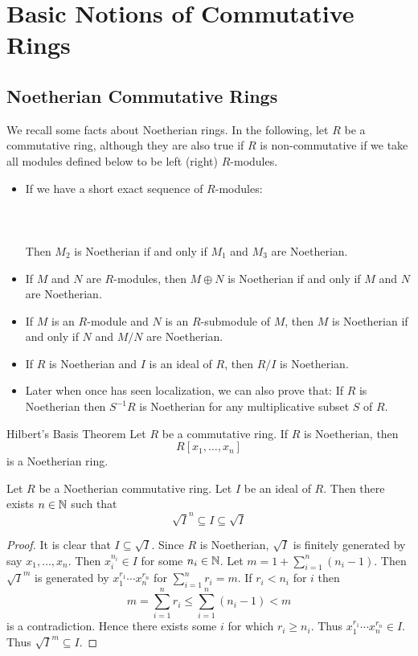 \documentclass[a4paper]{article}
\begin{document}
\pagebreak
\section{Basic Notions of Commutative Rings}
\subsection{Noetherian Commutative Rings}
We recall some facts about Noetherian rings. In the following, let $R$ be a commutative ring, although they are also true if $R$ is non-commutative if we take all modules defined below to be left (right) $R$-modules. 

\begin{itemize}
\item If we have a short exact sequence of $R$-modules: \\~\\
\\~\\
Then $M_2$ is Noetherian if and only if $M_1$ and $M_3$ are Noetherian. 
\item If $M$ and $N$ are $R$-modules, then $M\oplus N$ is Noetherian if and only if $M$ and $N$ are Noetherian. 
\item If $M$ is an $R$-module and $N$ is an $R$-submodule of $M$, then $M$ is Noetherian if and only if $N$ and $M/N$ are Noetherian.
\item If $R$ is Noetherian and $I$ is an ideal of $R$, then $R/I$ is Noetherian. 
\item Later when once has seen localization, we can also prove that: If $R$ is Noetherian then $S^{-1}R$ is Noetherian for any multiplicative subset $S$ of $R$. 
\end{itemize}

\begin{thm}{Hilbert's Basis Theorem}{} Let $R$ be a commutative ring. If $R$ is Noetherian, then $$R[x_1,\dots,x_n]$$ is a Noetherian ring. 
\end{thm}

\begin{prp}{}{} Let $R$ be a Noetherian commutative ring. Let $I$ be an ideal of $R$. Then there exists $n\in\mathbb{N}$ such that $$\sqrt{I}^n\subseteq I\subseteq\sqrt{I}$$ \tcbline
\begin{proof}
It is clear that $I\subseteq\sqrt{I}$. Since $R$ is Noetherian, $\sqrt{I}$ is finitely generated by say $x_1,\dots,x_n$. Then $x_i^{n_i}\in I$ for some $n_i\in\mathbb{N}$. Let $m=1+\sum_{i=1}^n(n_i-1)$. Then $\sqrt{I}^m$ is generated by $x_1^{r_1}\cdots x_n^{r_n}$ for $\sum_{i=1}^nr_i=m$. If $r_i<n_i$ for $i$ then $$m=\sum_{i=1}^nr_i\leq\sum_{i=1}^n(n_i-1)<m$$ is a contradiction. Hence there exists some $i$ for which $r_i\geq n_i$. Thus $x_1^{r_1}\cdots x_n^{r_n}\in I$. Thus $\sqrt{I}^m\subseteq I$. 
\end{proof}
\end{prp}
\end{document}
